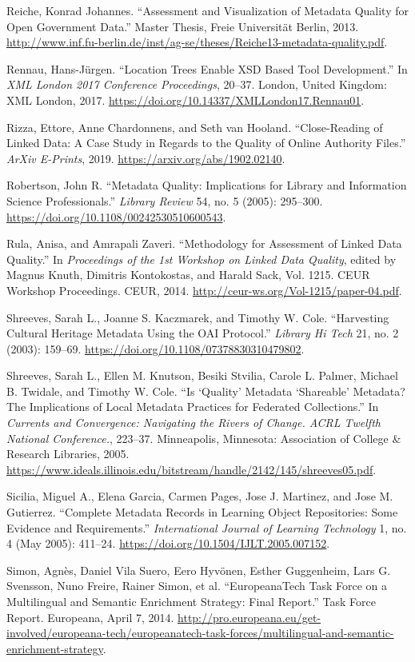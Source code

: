 Reiche, Konrad Johannes. “Assessment and Visualization of Metadata Quality for Open Government Data.” Master Thesis, Freie Universität Berlin, 2013. \url{http://www.inf.fu-berlin.de/inst/ag-se/theses/Reiche13-metadata-quality.pdf}.

Rennau, Hans-Jürgen. “Location Trees Enable XSD Based Tool Development.” In \emph{XML London 2017 Conference Proceedings}, 20–37. London, United Kingdom: XML London, 2017. \url{https://doi.org/10.14337/XMLLondon17.Rennau01}.

Rizza, Ettore, Anne Chardonnens, and Seth van Hooland. “Close-Reading of Linked Data: A Case Study in Regards to the Quality of Online Authority Files.” \emph{ArXiv E-Prints}, 2019. \url{https://arxiv.org/abs/1902.02140}.

Robertson, John R. “Metadata Quality: Implications for Library and Information Science Professionals.” \emph{Library Review} 54, no. 5 (2005): 295–300. \url{https://doi.org/10.1108/00242530510600543}.

Rula, Anisa, and Amrapali Zaveri. “Methodology for Assessment of Linked Data Quality.” In \emph{Proceedings of the 1st Workshop on Linked Data Quality}, edited by Magnus Knuth, Dimitris Kontokostas, and Harald Sack, Vol. 1215. CEUR Workshop Proceedings. CEUR, 2014. \url{http://ceur-ws.org/Vol-1215/paper-04.pdf}.

Shreeves, Sarah L., Joanne S. Kaczmarek, and Timothy W. Cole. “Harvesting Cultural Heritage Metadata Using the OAI Protocol.” \emph{Library Hi Tech} 21, no. 2 (2003): 159–69. \url{https://doi.org/10.1108/07378830310479802}.

Shreeves, Sarah L., Ellen M. Knutson, Besiki Stvilia, Carole L. Palmer, Michael B. Twidale, and Timothy W. Cole. “Is ‘Quality’ Metadata ‘Shareable’ Metadata? The Implications of Local Metadata Practices for Federated Collections.” In \emph{Currents and Convergence: Navigating the Rivers of Change. ACRL Twelfth National Conference.}, 223–37. Minneapolis, Minnesota: Association of College \& Research Libraries, 2005. \url{https://www.ideals.illinois.edu/bitstream/handle/2142/145/shreeves05.pdf}.

Sicilia, Miguel A., Elena Garcia, Carmen Pages, Jose J. Martinez, and Jose M. Gutierrez. “Complete Metadata Records in Learning Object Repositories: Some Evidence and Requirements.” \emph{International Journal of Learning Technology} 1, no. 4 (May 2005): 411–24. \url{https://doi.org/10.1504/IJLT.2005.007152}.

Simon, Agnès, Daniel Vila Suero, Eero Hyvönen, Esther Guggenheim, Lars G. Svensson, Nuno Freire, Rainer Simon, et al. “EuropeanaTech Task Force on a Multilingual and Semantic Enrichment Strategy: Final Report.” Task Force Report. Europeana, April 7, 2014. \url{http://pro.europeana.eu/get-involved/europeana-tech/europeanatech-task-forces/multilingual-and-semantic-enrichment-strategy}.

